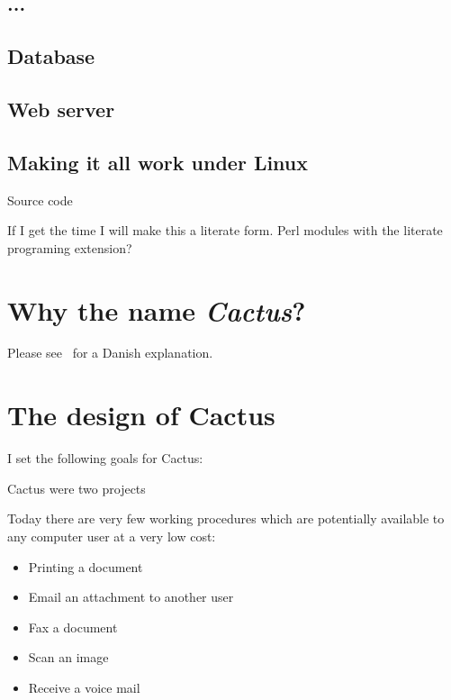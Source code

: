 \subsection{...}


\subsection{Database}

\subsection{Web server}

\subsection{Making it all work under Linux}
   
Source code

If I get the time I will make this a literate form. Perl
modules with the literate programing extension?


\section{Why the name \textit{Cactus}?}

Please see~ for a Danish explanation.



\section{The design of Cactus}
\label{sec:the-design-of-cactus}

I set the following goals for Cactus:

Cactus were two projects

Today there are very few working procedures which are
potentially available to any computer user at a very low
cost:

\begin{itemize}
\item Printing a document
\item Email an attachment to another user
\item Fax a document
\item Scan an image
\item Receive a voice mail
\end{itemize}


